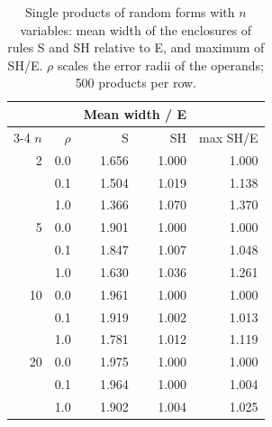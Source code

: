\begin{table}[t]
\centering
\caption{Single products of random forms with $n$ variables: mean width of the enclosures of rules S and SH relative to E, and maximum of SH/E. $\rho$ scales the error radii of the operands; 500 products per row.}
\label{tab:random}
\small
\begin{tabular}{rrrrr}
\toprule
 & & \multicolumn{2}{c}{Mean width / E} & \\
\cmidrule(lr){3-4}
$n$ & $\rho$ & S & SH & max SH/E \\
\midrule
2 & 0.0 & 1.656 & 1.000 & 1.000 \\
 & 0.1 & 1.504 & 1.019 & 1.138 \\
 & 1.0 & 1.366 & 1.070 & 1.370 \\
\midrule
5 & 0.0 & 1.901 & 1.000 & 1.000 \\
 & 0.1 & 1.847 & 1.007 & 1.048 \\
 & 1.0 & 1.630 & 1.036 & 1.261 \\
\midrule
10 & 0.0 & 1.961 & 1.000 & 1.000 \\
 & 0.1 & 1.919 & 1.002 & 1.013 \\
 & 1.0 & 1.781 & 1.012 & 1.119 \\
\midrule
20 & 0.0 & 1.975 & 1.000 & 1.000 \\
 & 0.1 & 1.964 & 1.000 & 1.004 \\
 & 1.0 & 1.902 & 1.004 & 1.025 \\
\bottomrule
\end{tabular}
\end{table}